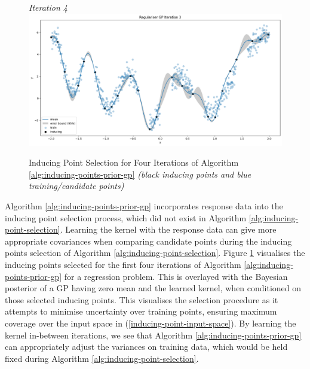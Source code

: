 \documentclass{article}
\numberwithin{equation}{section}
\begin{document}
\begin{figure}[h!]
\begin{minipage}{.5\textwidth}
  \textit{Iteration 4}
  \includegraphics[width=\linewidth, trim={0 0 0 0.77cm},clip]{thesis-report/figures/inducing_points_kernel/iteration-3/prediction.png}
\end{minipage}%
\caption{
Inducing Point Selection for Four Iterations of Algorithm \ref{alg:inducing-points-prior-gp} \textit{(black inducing points and blue training/candidate points)}
}
\label{inducing-points-and-kernel}
\end{figure}

Algorithm \ref{alg:inducing-points-prior-gp} incorporates response data into the inducing point selection process, which did not exist in Algorithm \ref{alg:inducing-point-selection}. 
Learning the kernel with the response data can give more appropriate covariances when comparing candidate points during the inducing points selection of Algorithm \ref{alg:inducing-point-selection}. 
Figure \ref{inducing-points-and-kernel} visualises the inducing points selected for the first four iterations of Algorithm \ref{alg:inducing-points-prior-gp} for a regression problem.
This is overlayed with the Bayesian posterior of a GP having zero mean and the learned kernel, when conditioned on those selected inducing points. 
This visualises the selection procedure as it attempts to minimise uncertainty over training points, ensuring maximum coverage over the input space in (\ref{inducing-point-input-space}).
By learning the kernel in-between iterations, we see that Algorithm \ref{alg:inducing-points-prior-gp} can appropriately adjust the variances on training data, which would be held fixed during Algorithm \ref{alg:inducing-point-selection}.
\end{document}
